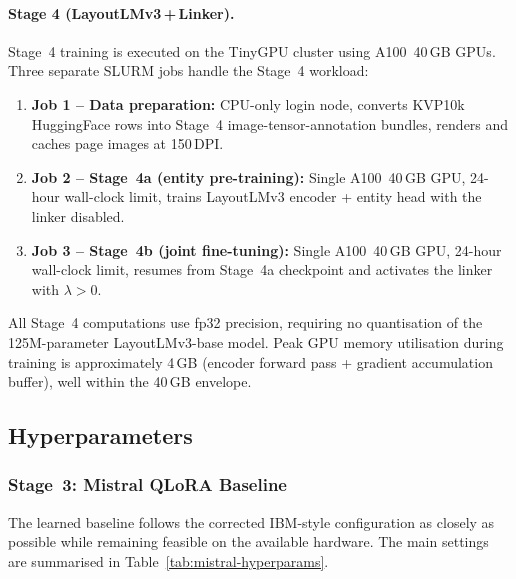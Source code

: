 \paragraph{Stage 4 (LayoutLMv3\,+\,Linker).}
Stage~4 training is executed on the TinyGPU cluster using A100~40\,GB
GPUs. Three separate SLURM jobs handle the Stage~4 workload:

\begin{enumerate}
  \item \textbf{Job 1 -- Data preparation:} CPU-only login node, converts
  KVP10k HuggingFace rows into Stage~4 image-tensor-annotation bundles,
  renders and caches page images at 150\,DPI.
  \item \textbf{Job 2 -- Stage~4a (entity pre-training):} Single A100~40\,GB
  GPU, 24-hour wall-clock limit, trains LayoutLMv3 encoder + entity head
  with the linker disabled.
  \item \textbf{Job 3 -- Stage~4b (joint fine-tuning):} Single A100~40\,GB
  GPU, 24-hour wall-clock limit, resumes from Stage~4a checkpoint and
  activates the linker with $\lambda > 0$.
\end{enumerate}

All Stage~4 computations use fp32 precision, requiring no
quantisation of the 125M-parameter LayoutLMv3-base model. Peak GPU memory
utilisation during training is approximately 4\,GB (encoder forward pass +
gradient accumulation buffer), well within the 40\,GB envelope.

\subsection{Hyperparameters}
\label{sec:hyperparameters}

\subsubsection{Stage~3: Mistral QLoRA Baseline}
\label{sec:stage3-hyperparams}

The learned baseline follows the corrected IBM-style configuration as closely
as possible while remaining feasible on the available hardware.
The main settings are summarised in Table~\ref{tab:mistral-hyperparams}.

